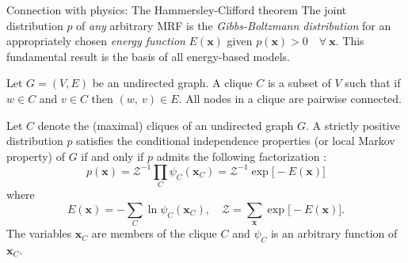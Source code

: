 \documentclass[8pt]{beamer}
\begin{document}
\begin{frame}[label={sec:org440a44b}]{Connection with physics: The Hammersley-Clifford theorem}
The joint distribution \(p\) of \emph{any} arbitrary MRF is the \emph{Gibbs-Boltzmann distribution} for an appropriately chosen \emph{energy function} \(E(\mathbf{x})\) given \(p(\mathbf{x}) > 0 \quad \forall~\mathbf{x}\). This fundamental result is the basis of all \alert{energy-based models}.
\begin{definition}[Clique]
Let \(G=(V, E)\) be an undirected graph. A clique \(C\) is a subset of \(V\) such that if \(w \in C\) and \(v \in C\) then \((w,~v) \in E\). All nodes in a clique are pairwise connected.
\hfill \blacksquare
\label{orge51d0be}
\end{definition}
\begin{theorem}
Let \(C\) denote the (maximal) cliques of an undirected graph \(G\). A strictly positive distribution \(p\) satisfies the conditional independence properties (or local Markov property) of \(G\) if and only if \(p\) admits the following factorization  \cite{clifford1990markov}:
\[
p(\mathbf{x}) = \mathcal{Z}^{-1} \prod_{C} \psi_{C} (\mathbf{x}_C) = \mathcal{Z}^{-1} \exp \big[- E(\mathbf{x})\big]
\]
where
\[
E(\mathbf{x}) = - \sum_{C} \ln \psi_{C} (\mathbf{x}_{C}), \quad \mathcal{Z} = \sum_{\mathbf{x}} \exp \big[- E(\mathbf{x})\big].
\]
The variables \(\mathbf{x}_{C}\) are members of the clique \(C\) and \(\psi_{C}\) is an arbitrary function of \(\mathbf{x}_{C}\).
\hfill \blacksquare
\label{org91b2496}
\end{theorem}
\end{frame}
\end{document}
